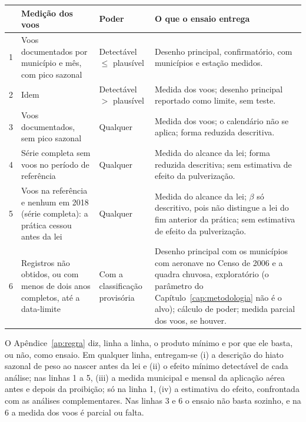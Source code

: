 \begin{quadro}[htb]
\caption{\label{qua:regra}Regra de decisão: o que o ensaio entrega em cada cenário}
\centering
\footnotesize
\begin{tabular}{@{}p{0.3cm}p{4.4cm}p{2.6cm}p{7.3cm}@{}}
\toprule
 & Medição dos voos & Poder & O que o ensaio entrega \\
\midrule
1 & Voos documentados por município e mês, com pico sazonal & Detectável $\leq$ plausível &
Desenho principal, confirmatório, com municípios e estação medidos. \\
2 & Idem & Detectável $>$ plausível &
Medida dos voos; desenho principal reportado como limite, sem teste. \\
3 & Voos documentados, sem pico sazonal & Qualquer &
Medida dos voos; o calendário não se aplica; forma reduzida descritiva. \\
4 & Série completa sem voos no período de referência & Qualquer &
Medida do alcance da lei; forma reduzida descritiva; sem estimativa de efeito da pulverização. \\
5 & Voos na referência e nenhum em 2018 (série completa): a prática cessou antes da lei & Qualquer &
Medida do alcance da lei; $\beta$ só descritivo, pois não distingue a lei do fim anterior da prática; sem estimativa de efeito da pulverização. \\
6 & Registros não obtidos, ou com menos de dois anos completos, até a data-limite & Com a classificação provisória &
Desenho principal com os municípios com aeronave no Censo de 2006 e a quadra chuvosa, exploratório (o parâmetro do Capítulo~\ref{cap:metodologia} não é o alvo); cálculo de poder; medida parcial dos voos, se houver. \\
\bottomrule
\end{tabular}
\end{quadro}

O Apêndice~\ref{ap:regra} diz, linha a linha, o produto mínimo e por que ele basta, ou não, como ensaio. Em
qualquer linha, entregam-se (i) a descrição do hiato sazonal de peso ao nascer
antes da lei e (ii) o efeito mínimo detectável de cada análise; nas linhas 1 a
5, (iii) a medida municipal e mensal da aplicação aérea antes e depois da
proibição; só na linha 1, (iv) a estimativa do efeito, confrontada com as
análises complementares. Nas linhas 3 e 6 o ensaio não basta sozinho, e na 6
a medida dos voos é parcial ou falta.
